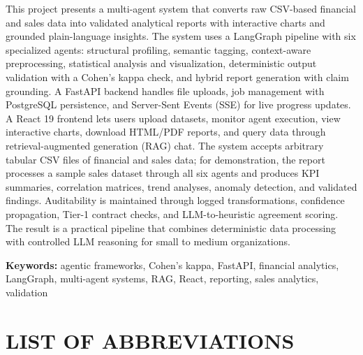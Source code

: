 \documentclass[12pt,a4paper,openany]{report}
\begin{document}
\begin{small}
This project presents a multi-agent system that converts raw CSV-based financial and sales data into validated analytical reports with interactive charts and grounded plain-language insights. The system uses a LangGraph pipeline with six specialized agents: structural profiling, semantic tagging, context-aware preprocessing, statistical analysis and visualization, deterministic output validation with a Cohen's kappa check, and hybrid report generation with claim grounding. A FastAPI backend handles file uploads, job management with PostgreSQL persistence, and Server-Sent Events (SSE) for live progress updates. A React 19 frontend lets users upload datasets, monitor agent execution, view interactive charts, download HTML/PDF reports, and query data through retrieval-augmented generation (RAG) chat. The system accepts arbitrary tabular CSV files of financial and sales data; for demonstration, the report processes a sample sales dataset through all six agents and produces KPI summaries, correlation matrices, trend analyses, anomaly detection, and validated findings. Auditability is maintained through logged transformations, confidence propagation, Tier-1 contract checks, and LLM-to-heuristic agreement scoring. The result is a practical pipeline that combines deterministic data processing with controlled LLM reasoning for small to medium organizations.
\end{small}

\vspace{1em}
\noindent\textbf{Keywords:} agentic frameworks, Cohen's kappa, FastAPI, financial analytics, LangGraph, multi-agent systems, RAG, React, reporting, sales analytics, validation

\clearpage

\begin{singlespace}
\tableofcontents
\end{singlespace}

\clearpage
{}
{}
\begin{singlespace}
\listoffigures
\end{singlespace}

\clearpage
{}
{}
\begin{singlespace}
\listoftables
\end{singlespace}

\chapter*{LIST OF ABBREVIATIONS}
\end{document}
